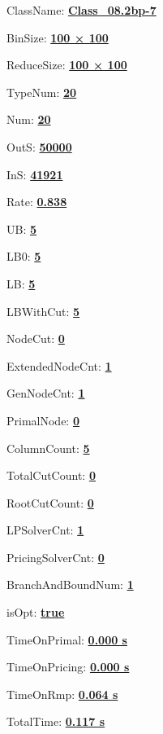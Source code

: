 \documentclass[11pt]{article}
\begin{document}
\pagestyle{empty}


ClassName: \underline{\textbf{Class_08.2bp-7}}
\par
BinSize: \underline{\textbf{100 × 100}}
\par
ReduceSize: \underline{\textbf{100 × 100}}
\par
TypeNum: \underline{\textbf{20}}
\par
Num: \underline{\textbf{20}}
\par
OutS: \underline{\textbf{50000}}
\par
InS: \underline{\textbf{41921}}
\par
Rate: \underline{\textbf{0.838}}
\par
UB: \underline{\textbf{5}}
\par
LB0: \underline{\textbf{5}}
\par
LB: \underline{\textbf{5}}
\par
LBWithCut: \underline{\textbf{5}}
\par
NodeCut: \underline{\textbf{0}}
\par
ExtendedNodeCnt: \underline{\textbf{1}}
\par
GenNodeCnt: \underline{\textbf{1}}
\par
PrimalNode: \underline{\textbf{0}}
\par
ColumnCount: \underline{\textbf{5}}
\par
TotalCutCount: \underline{\textbf{0}}
\par
RootCutCount: \underline{\textbf{0}}
\par
LPSolverCnt: \underline{\textbf{1}}
\par
PricingSolverCnt: \underline{\textbf{0}}
\par
BranchAndBoundNum: \underline{\textbf{1}}
\par
isOpt: \underline{\textbf{true}}
\par
TimeOnPrimal: \underline{\textbf{0.000 s}}
\par
TimeOnPricing: \underline{\textbf{0.000 s}}
\par
TimeOnRmp: \underline{\textbf{0.064 s}}
\par
TotalTime: \underline{\textbf{0.117 s}}
\par
\newpage


\end{document}
